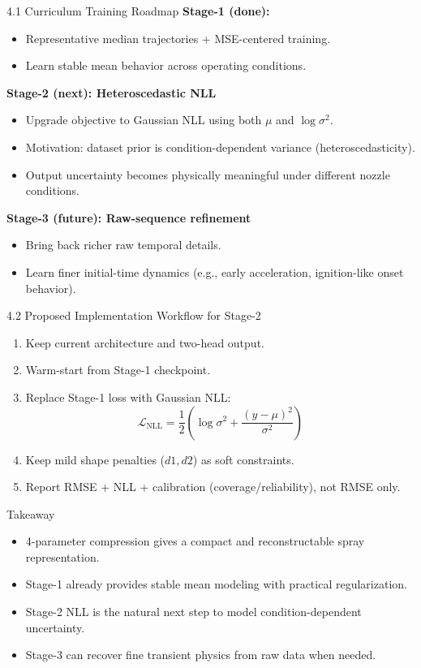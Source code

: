 \documentclass[UTF8,aspectratio=169]{ctexbeamer}
\begin{document}
\begin{frame}{4.1 Curriculum Training Roadmap}
\textbf{Stage-1 (done):}
\begin{itemize}
  \item Representative median trajectories + MSE-centered training.
  \item Learn stable mean behavior across operating conditions.
\end{itemize}

\textbf{Stage-2 (next): Heteroscedastic NLL}
\begin{itemize}
  \item Upgrade objective to Gaussian NLL using both $\mu$ and $\log\sigma^2$.
  \item Motivation: dataset prior is condition-dependent variance (heteroscedasticity).
  \item Output uncertainty becomes physically meaningful under different nozzle conditions.
\end{itemize}

\textbf{Stage-3 (future): Raw-sequence refinement}
\begin{itemize}
  \item Bring back richer raw temporal details.
  \item Learn finer initial-time dynamics (e.g., early acceleration, ignition-like onset behavior).
\end{itemize}
\end{frame}

\begin{frame}{4.2 Proposed Implementation Workflow for Stage-2}
\begin{enumerate}
  \item Keep current architecture and two-head output.
  \item Warm-start from Stage-1 checkpoint.
  \item Replace Stage-1 loss with Gaussian NLL:
  \[
  \mathcal{L}_{\mathrm{NLL}} = \frac{1}{2}\left(\log \sigma^2 + \frac{(y-\mu)^2}{\sigma^2}\right)
  \]
  \item Keep mild shape penalties ($d1,d2$) as soft constraints.
  \item Report RMSE + NLL + calibration (coverage/reliability), not RMSE only.
\end{enumerate}
\end{frame}

\begin{frame}{Takeaway}
\begin{itemize}
  \item 4-parameter compression gives a compact and reconstructable spray representation.
  \item Stage-1 already provides stable mean modeling with practical regularization.
  \item Stage-2 NLL is the natural next step to model condition-dependent uncertainty.
  \item Stage-3 can recover fine transient physics from raw data when needed.
\end{itemize}
\end{frame}
\end{document}
